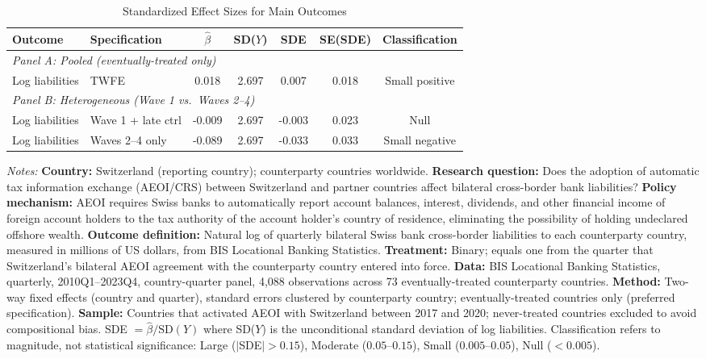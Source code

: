 \begin{table}[H]
\centering
\caption{Standardized Effect Sizes for Main Outcomes}
\label{tab:sde}
\begin{threeparttable}
\begin{tabular}{llccccc}
\toprule
Outcome & Specification & $\hat{\beta}$ & SD($Y$) & SDE & SE(SDE) & Classification \\
\midrule
\multicolumn{7}{l}{\textit{Panel A: Pooled (eventually-treated only)}} \\
Log liabilities & TWFE & 0.018 & 2.697 & 0.007 & 0.018 & Small positive \\
\midrule
\multicolumn{7}{l}{\textit{Panel B: Heterogeneous (Wave 1 vs.\ Waves 2--4)}} \\
Log liabilities & Wave 1 + late ctrl & -0.009 & 2.697 & -0.003 & 0.023 & Null \\
Log liabilities & Waves 2--4 only & -0.089 & 2.697 & -0.033 & 0.033 & Small negative \\
\bottomrule
\end{tabular}
\begin{tablenotes}[flushleft]
\small
\item \textit{Notes:} \textbf{Country:} Switzerland (reporting country); counterparty countries worldwide. \textbf{Research question:} Does the adoption of automatic tax information exchange (AEOI/CRS) between Switzerland and partner countries affect bilateral cross-border bank liabilities? \textbf{Policy mechanism:} AEOI requires Swiss banks to automatically report account balances, interest, dividends, and other financial income of foreign account holders to the tax authority of the account holder{'}s country of residence, eliminating the possibility of holding undeclared offshore wealth. \textbf{Outcome definition:} Natural log of quarterly bilateral Swiss bank cross-border liabilities to each counterparty country, measured in millions of US dollars, from BIS Locational Banking Statistics. \textbf{Treatment:} Binary; equals one from the quarter that Switzerland{'}s bilateral AEOI agreement with the counterparty country entered into force. \textbf{Data:} BIS Locational Banking Statistics, quarterly, 2010Q1--2023Q4, country-quarter panel, 4,088 observations across 73 eventually-treated counterparty countries. \textbf{Method:} Two-way fixed effects (country and quarter), standard errors clustered by counterparty country; eventually-treated countries only (preferred specification). \textbf{Sample:} Countries that activated AEOI with Switzerland between 2017 and 2020; never-treated countries excluded to avoid compositional bias. SDE $= \hat{\beta} / \text{SD}(Y)$ where SD($Y$) is the unconditional standard deviation of log liabilities. Classification refers to magnitude, not statistical significance: Large ($|$SDE$| > 0.15$), Moderate ($0.05$--$0.15$), Small ($0.005$--$0.05$), Null ($< 0.005$).
\end{tablenotes}
\end{threeparttable}
\end{table}
